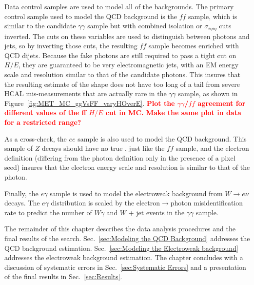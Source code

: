 \documentclass[dissertation.tex]{subfiles}
\begin{document}
Data control samples are used to model all of the backgrounds.  The primary control sample used to model the QCD background is the $\mathit{ff}$ sample, which is similar to the candidate $\gamma\gamma$ sample but with combined isolation or $\sigma_{i\eta i\eta}$ cuts inverted.  The cuts on these variables are used to distinguish between photons and jets, so by inverting those cuts, the resulting $\mathit{ff}$ sample becomes enriched with QCD dijets.  Because the fake photons are still required to pass a tight cut on $H/E$, they are guaranteed to be very electromagnetic jets, with an EM energy scale and resolution similar to that of the candidate photons.  This insures that the resulting estimate of the \MET shape does not have too long of a tail from severe HCAL mis-measurements that are actually rare in the $\gamma\gamma$ sample, as shown in Figure~\ref{fig:MET_MC_ggVsFF_varyHOverE}.  \textcolor{red}{\textbf{Plot the $\gamma\gamma$/$\mathit{ff}$ \MET agreement for different values of the ff $H/E$ cut in MC.  Make the same plot in data for a restricted \MET range?}}


As a cross-check, the $ee$ sample is also used to model the QCD background.  This sample of $Z$ decays should have no true \MET, just like the $\mathit{ff}$ sample, and the electron definition (differing from the photon definition only in the presence of a pixel seed) insures that the electron energy scale and resolution is similar to that of the photon.

Finally, the $e\gamma$ sample is used to model the electroweak background from $W\rightarrow e\nu$ decays.  The $e\gamma$ \MET distribution is scaled by the electron$\rightarrow$photon misidentification rate to predict the number of $W\gamma$ and $W$ + jet events in the $\gamma\gamma$ sample.

The remainder of this chapter describes the data analysis procedures and the final results of the search.  Sec.~\ref{sec:Modeling the QCD Background} addresses the QCD background estimation.  Sec.~\ref{sec:Modeling the Electroweak background} addresses the electroweak background estimation.  The chapter concludes with a discussion of systematic errors in Sec.~\ref{sec:Systematic Errors} and a presentation of the final results in Sec.~\ref{sec:Results}.
\end{document}
